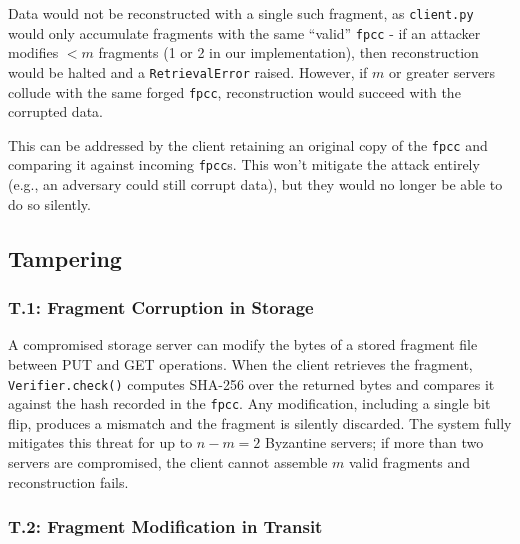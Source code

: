 \documentclass[../veristore_security_model.tex]{subfiles}
\begin{document}
Data would not be reconstructed with a single such fragment, as \texttt{client.py} would only accumulate fragments with the same ``valid'' \texttt{fpcc} - if an attacker modifies $< m$ fragments (1 or 2 in our implementation), then reconstruction would be halted and a \texttt{RetrievalError} raised. However, if $m$ or greater servers collude with the same forged \texttt{fpcc}, reconstruction would succeed with the corrupted data.

This can be addressed by the client retaining an original copy of the \texttt{fpcc} and comparing it against incoming \texttt{fpcc}s. This won't mitigate the attack entirely (e.g., an adversary could still corrupt data), but they would no longer be able to do so silently.

\subsection{Tampering}


\subsubsection{T.1: Fragment Corruption in Storage}


A compromised storage server can modify the bytes of a stored fragment file between PUT and GET operations. When the client retrieves the fragment, \texttt{Verifier.check()} computes SHA-256 over the returned bytes and compares it against the hash recorded in the \texttt{fpcc}. Any modification, including a single bit flip, produces a mismatch and the fragment is silently discarded. The system fully mitigates this threat for up to $n - m = 2$ Byzantine servers; if more than two servers are compromised, the client cannot assemble $m$ valid fragments and reconstruction fails.

\subsubsection{T.2: Fragment Modification in Transit}
\end{document}
